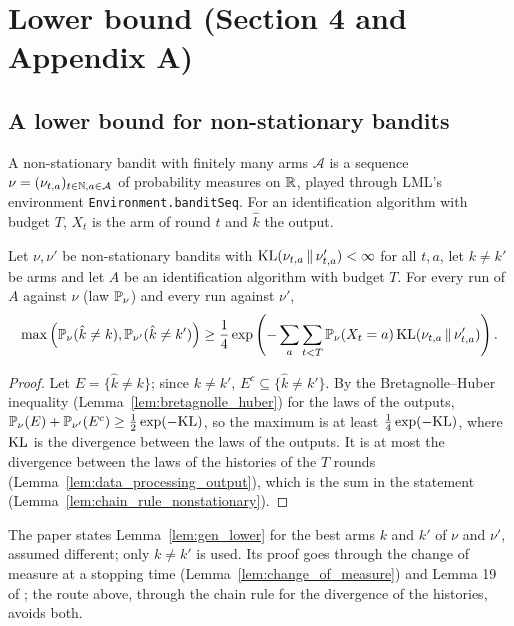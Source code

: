 \chapter{Lower bound (Section 4 and Appendix A)}
\label{chap:lower_bound}

\section{A lower bound for non-stationary bandits}

A non-stationary bandit with finitely many arms $\mathcal{A}$ is a sequence
$\nu = (\nu_{t, a})_{t \in \mathbb{N}, a \in \mathcal{A}}$ of probability measures on $\mathbb{R}$, played through
LML's environment \texttt{Environment.banditSeq}. For an identification algorithm with budget
$T$, $X_t$ is the arm of round $t$ and $\hat k$ the output.

\begin{lemma}
  \label{lem:gen_lower}
  \leanok
  Let $\nu, \nu'$ be non-stationary bandits with $\mathrm{KL}(\nu_{t, a} \,\|\, \nu'_{t, a}) < \infty$ for
  all $t, a$, let $k \ne k'$ be arms and let $A$ be an identification algorithm with budget $T$.
  For every run of $A$ against $\nu$ (law $\mathbb{P}_\nu$) and every run against $\nu'$,
  \[
    \max\left(\mathbb{P}_\nu(\hat k \ne k), \mathbb{P}_{\nu'}(\hat k \ne k')\right)
    \ge \frac14 \exp\left(-\sum_{a} \sum_{t < T} \mathbb{P}_\nu(X_t = a)\,
      \mathrm{KL}(\nu_{t, a} \,\|\, \nu'_{t, a})\right).
  \]
\end{lemma}

\begin{proof}
  \leanok
  Let $E = \{\hat k \ne k\}$; since $k \ne k'$, $E^c \subseteq \{\hat k \ne k'\}$. By the
  Bretagnolle--Huber inequality (Lemma~\ref{lem:bretagnolle_huber}) for the laws of the outputs,
  $\mathbb{P}_\nu(E) + \mathbb{P}_{\nu'}(E^c) \ge \frac12 \exp(-\mathrm{KL})$, so the maximum is at least
  $\frac14 \exp(-\mathrm{KL})$, where $\mathrm{KL}$ is the divergence between the laws of the outputs. It is at
  most the divergence between the laws of the histories of the $T$ rounds
  (Lemma~\ref{lem:data_processing_output}), which is the sum in the statement
  (Lemma~\ref{lem:chain_rule_nonstationary}).
\end{proof}

\begin{remark}
  The paper states Lemma~\ref{lem:gen_lower} for the best arms $k$ and $k'$ of $\nu$ and $\nu'$,
  assumed different; only $k \ne k'$ is used. Its proof goes through the change of measure at a
  stopping time (Lemma~\ref{lem:change_of_measure}) and Lemma 19 of
  \cite{kaufmann2016complexity}; the route above, through the chain rule for the divergence of the
  histories, avoids both.
\end{remark}

